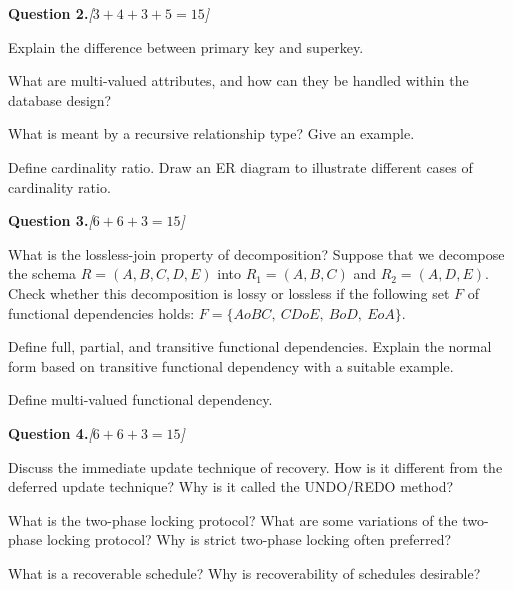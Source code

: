 \documentclass[11pt,a4paper]{article}
\newcommand{\pts}[1]{\hfill   \textit{[#1]}}
\begin{document}
\bigskip




\noindent   \textbf{Question 2.}\pts{$3+4+3+5=15$}

\begin{parts}
  \item Explain the difference between primary key and superkey.
  \item What are multi-valued attributes, and how can they be handled within the database design?
  \item What is meant by a recursive relationship type? Give an example.
  \item Define cardinality ratio. Draw an ER diagram to illustrate different cases of cardinality ratio.
\end{parts}

\bigskip




\noindent   \textbf{Question 3.}\pts{$6+6+3=15$}

\begin{parts}
  \item What is the lossless-join property of decomposition? Suppose that we decompose the schema $R = (A, B, C, D, E)$ into $R_1 = (A, B, C)$ and $R_2 = (A, D, E)$. Check whether this decomposition is lossy or lossless if the following set $F$ of functional dependencies holds: $F = \{A  o BC,\ CD  o E,\ B  o D,\ E  o A\}$.
  \item Define full, partial, and transitive functional dependencies. Explain the normal form based on transitive functional dependency with a suitable example.
  \item Define multi-valued functional dependency.
\end{parts}

\bigskip




\noindent   \textbf{Question 4.}\pts{$6+6+3=15$}

\begin{parts}
  \item Discuss the immediate update technique of recovery. How is it different from the deferred update technique? Why is it called the UNDO/REDO method?
  \item What is the two-phase locking protocol? What are some variations of the two-phase locking protocol? Why is strict two-phase locking often preferred?
  \item What is a recoverable schedule? Why is recoverability of schedules desirable?
\end{parts}
\end{document}
